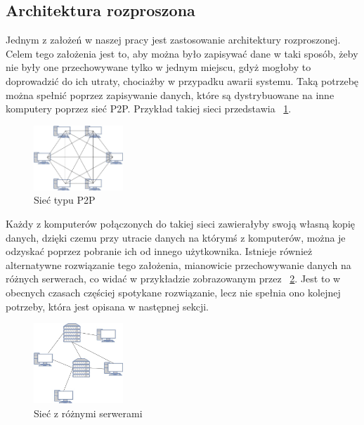\subsection{Architektura rozproszona}
\label{sec:Rozproszenie}
Jednym z założeń w naszej pracy jest zastosowanie architektury rozproszonej. Celem tego założenia jest to, aby można było zapisywać dane w taki sposób, żeby nie były one przechowywane tylko w jednym miejscu, gdyż mogłoby to doprowadzić do ich utraty, chociażby w przypadku awarii systemu. Taką potrzebę można spełnić poprzez zapisywanie danych, które są dystrybuowane na inne komputery poprzez sieć P2P. Przykład takiej sieci przedstawia \figurename{~\ref{fig:P2P}}.
\begin{figure}[!ht]
	\centering
		\includegraphics[width=0.3\textwidth]{Images/P2P.jpg}
	\caption{Sieć typu P2P}
	\label{fig:P2P}
\end{figure}
\newline Każdy z komputerów połączonych do takiej sieci zawierałyby swoją własną kopię danych, dzięki czemu przy utracie danych na którymś z komputerów, można je odzyskać poprzez pobranie ich od innego użytkownika.
Istnieje również alternatywne rozwiązanie tego założenia, mianowicie przechowywanie danych na różnych serwerach, co widać w przykładzie zobrazowanym przez \figurename{~\ref{fig:SiecSerwery}}. Jest to w obecnych czasach częściej spotykane rozwiązanie, lecz nie spełnia ono kolejnej potrzeby, która jest opisana w następnej sekcji.
\begin{figure}[!ht]
	\centering
		\includegraphics[width=0.3\textwidth]{Images/Siec_serwery.jpg}
	\caption{Sieć z różnymi serwerami}
	\label{fig:SiecSerwery}
\end{figure}
\newline

